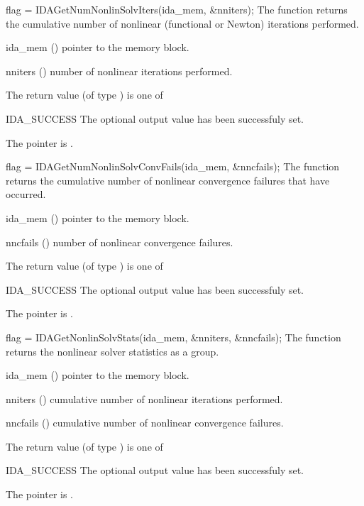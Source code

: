 {}
{
  flag = IDAGetNumNonlinSolvIters(ida\_mem, \&nniters);
}
{
  The function  returns the
  cumulative number of nonlinear (functional or Newton) iterations performed. 
}
{
  \begin{args}[nniters]
  \item[ida\_mem] ()
    pointer to the {\ida} memory block.
  \item[nniters] ()
    number of nonlinear iterations performed.
  \end{args}
}
{
  The return value  (of type ) is one of
  \begin{args}
  \item[IDA\_SUCCESS] 
    The optional output value has been successfuly set.
  \item[\Id{IDA\_MEM\_NULL}]
    The  pointer is .
  \end{args}
}
{}
{
  flag = IDAGetNumNonlinSolvConvFails(ida\_mem, \&nncfails);
}
{
  The function  returns the
  cumulative number of nonlinear convergence failures that have occurred.
}
{
  \begin{args}[nncfails]
  \item[ida\_mem] ()
    pointer to the {\ida} memory block.
  \item[nncfails] ()
    number of nonlinear convergence failures.
  \end{args}
}
{
  The return value  (of type ) is one of
  \begin{args}
  \item[IDA\_SUCCESS] 
    The optional output value has been successfuly set.
  \item[\Id{IDA\_MEM\_NULL}]
    The  pointer is .
  \end{args}
}
{}
{
  flag = IDAGetNonlinSolvStats(ida\_mem, \&nniters, \&nncfails);
}
{
  The function  returns the
  {\ida} nonlinear solver statistics as a group.
}
{
  \begin{args}[nncfails]
  \item[ida\_mem] ()
    pointer to the {\ida} memory block.
  \item[nniters] ()
    cumulative number of nonlinear iterations performed.
  \item[nncfails] ()
    cumulative number of nonlinear convergence failures.
  \end{args}
}
{
  The return value  (of type ) is one of
  \begin{args}
  \item[IDA\_SUCCESS] 
    The optional output value has been successfuly set.
  \item[\Id{IDA\_MEM\_NULL}]
    The  pointer is .
  \end{args}
}
{}

